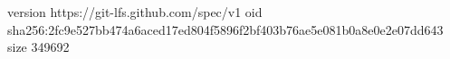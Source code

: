 version https://git-lfs.github.com/spec/v1
oid sha256:2fc9e527bb474a6aced17ed804f5896f2bf403b76ae5e081b0a8e0e2e07dd643
size 349692

